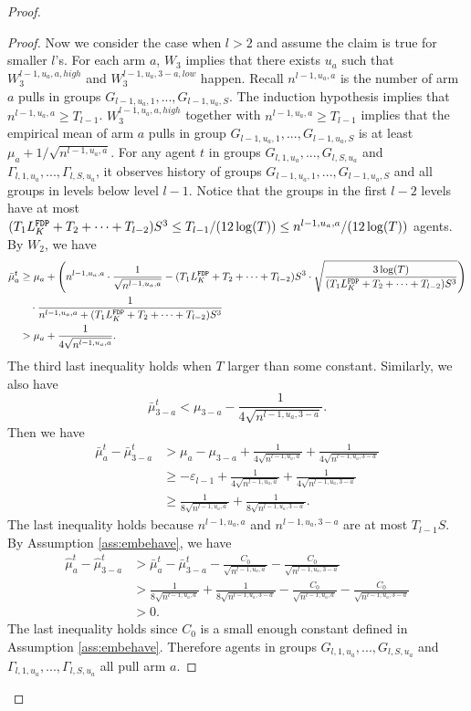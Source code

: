 \begin{proof}
\begin{proof}
Now we consider the case when $l > 2$ and assume the claim is true for smaller $l$'s. For each arm $a$, $W_3$ implies that there exists $u_a$ such that $W^{l-1,u_a,a,high}_3$ and $W^{l-1,u_a,3-a,low}_3$ happen. Recall $n^{l-1,u_a,a}$ is the number of arm $a$ pulls in groups $G_{l-1,u_a,1},...,G_{l-1,u_a,S}$. The induction hypothesis implies that $n^{l-1,u_a,a} \geq T_{l-1}$. $W^{l-1,u_a,a,high}_3$ together with $n^{l-1,u_a,a} \geq T_{l-1}$ implies that the empirical mean of arm $a$ pulls in group $G_{l-1,u_a,1},...,G_{l-1,u_a,S}$ is at least $\mu_a + 1/\sqrt{n^{l-1,u_a,a}}$. For any agent $t$ in groups $G_{l,1,u_a},...,G_{l,S,u_a}$ and $\Gamma_{l,1,u_a},...,\Gamma_{l,S,u_a}$, it observes history of groups $G_{l-1,u_a,1},...,G_{l-1,u_a,S}$ and all groups in levels below level $l-1$. Notice that the groups in the first $l-2$ levels have at most $(T_1 L^\mathtt{FDP}_K + T_2 + \cdots +T_{l-2})S^3 \leq T_{l-1}/(12\log(T)) \leq n^{l-1,u_a,a}/(12\log(T))$ agents. By $W_2$, we have
\begin{align*}
\bar{\mu}_a ^t &\geq \mu_a + \left(n^{l-1,u_a,a}  \cdot \frac{1}{\sqrt{n^{l-1,u_a,a} }}- (T_1 L^\mathtt{FDP}_K + T_2 + \cdots +T_{l-2})S^3\cdot \sqrt{\frac{3\log(T)}{ (T_1 L^\mathtt{FDP}_K + T_2 + \cdots +T_{l-2})S^3}} \right) \\
&~~~\cdot \frac{1}{n^{l-1,u_a,a}+ (T_1 L^\mathtt{FDP}_K + T_2 + \cdots +T_{l-2})S^3} \\
&> \mu_a + \frac{1}{4\sqrt{n^{l-1,u_a,a}  }}.
\end{align*}
The third last inequality holds when $T$ larger than some constant.
Similarly, we also have
\[
\bar{\mu}_{3-a}^t < \mu_{3-a}   -\frac{1}{4\sqrt{n^{l-1,u_a,3-a}  }}.
\]
Then we have
\begin{align*}
\bar{\mu}^t_a - \bar{\mu}^t_{3-a} &> \mu_a - \mu_{3-a}+ \frac{1}{4\sqrt{n^{l-1,u_a,a}  }} +\frac{1}{4\sqrt{n^{l-1,u_a,3-a}  }}\\
&\geq -\varepsilon_{l-1}+ \frac{1}{4\sqrt{n^{l-1,u_a,a}  }} +\frac{1}{4\sqrt{n^{l-1,u_a,3-a}  }}\\
&\geq \frac{1}{8\sqrt{n^{l-1,u_a,a}  }} +\frac{1}{8\sqrt{n^{l-1,u_a,3-a}  }}.
\end{align*}
The last inequality holds because $n^{l-1,u_a,a}$ and $n^{l-1,u_a,3-a}$ are at most $T_{l-1} S$. By Assumption \ref{ass:embehave}, we have
\begin{align*}
\hat{\mu}_a^t - \hat{\mu}_{3-a}^t &> \bar{\mu}^t_a - \bar{\mu}^t_{3-a} -  \frac{C_0}{\sqrt{n^{l-1,u_a,a} }} - \frac{C_0}{\sqrt{n^{l-1,u_a,3-a}}}\\
&> \frac{1}{8\sqrt{n^{l-1,u_a,a}  }} +\frac{1}{8\sqrt{n^{l-1,u_a,3-a}  }} -  \frac{C_0}{\sqrt{n^{l-1,u_a,a} }} - \frac{C_0}{\sqrt{n^{l-1,u_a,3-a}}}\\
&>0.
\end{align*}
The last inequality holds since $C_0$ is a small enough constant defined in Assumption \ref{ass:embehave}.
Therefore agents in groups $G_{l,1,u_a},...,G_{l,S,u_a}$ and $\Gamma_{l,1,u_a},...,\Gamma_{l,S,u_a}$ all pull arm $a$.
\end{proof}


\end{proof}
